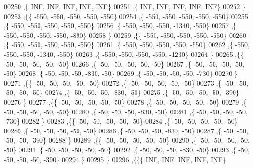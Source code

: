 \begin{DoxyCode}
00250   ,\{   \hyperlink{energy__const_8h_a12c2040f25d8e3a7b9e1c2024c618cb6}{INF},   \hyperlink{energy__const_8h_a12c2040f25d8e3a7b9e1c2024c618cb6}{INF},   \hyperlink{energy__const_8h_a12c2040f25d8e3a7b9e1c2024c618cb6}{INF},   \hyperlink{energy__const_8h_a12c2040f25d8e3a7b9e1c2024c618cb6}{INF},   INF\}
00251   ,\{   \hyperlink{energy__const_8h_a12c2040f25d8e3a7b9e1c2024c618cb6}{INF},   \hyperlink{energy__const_8h_a12c2040f25d8e3a7b9e1c2024c618cb6}{INF},   \hyperlink{energy__const_8h_a12c2040f25d8e3a7b9e1c2024c618cb6}{INF},   \hyperlink{energy__const_8h_a12c2040f25d8e3a7b9e1c2024c618cb6}{INF},   INF\}
00252   \}
00253  ,\{\{  -550,  -550,  -550,  -550,  -550\}
00254   ,\{  -550,  -550,  -550,  -550,  -550\}
00255   ,\{  -550,  -550,  -550,  -550,  -550\}
00256   ,\{  -550,  -550,  -550, -1340,  -550\}
00257   ,\{  -550,  -550,  -550,  -550,  -890\}
00258   \}
00259  ,\{\{  -550,  -550,  -550,  -550,  -550\}
00260   ,\{  -550,  -550,  -550,  -550,  -550\}
00261   ,\{  -550,  -550,  -550,  -550,  -550\}
00262   ,\{  -550,  -550,  -550, -1340,  -550\}
00263   ,\{  -550,  -550,  -550,  -550, -1230\}
00264   \}
00265  ,\{\{   -50,   -50,   -50,   -50,   -50\}
00266   ,\{   -50,   -50,   -50,   -50,   -50\}
00267   ,\{   -50,   -50,   -50,   -50,   -50\}
00268   ,\{   -50,   -50,   -50,  -830,   -50\}
00269   ,\{   -50,   -50,   -50,   -50,  -730\}
00270   \}
00271  ,\{\{   -50,   -50,   -50,   -50,   -50\}
00272   ,\{   -50,   -50,   -50,   -50,   -50\}
00273   ,\{   -50,   -50,   -50,   -50,   -50\}
00274   ,\{   -50,   -50,   -50,  -830,   -50\}
00275   ,\{   -50,   -50,   -50,   -50,  -390\}
00276   \}
00277  ,\{\{   -50,   -50,   -50,   -50,   -50\}
00278   ,\{   -50,   -50,   -50,   -50,   -50\}
00279   ,\{   -50,   -50,   -50,   -50,   -50\}
00280   ,\{   -50,   -50,   -50,  -830,   -50\}
00281   ,\{   -50,   -50,   -50,   -50,  -730\}
00282   \}
00283  ,\{\{   -50,   -50,   -50,   -50,   -50\}
00284   ,\{   -50,   -50,   -50,   -50,   -50\}
00285   ,\{   -50,   -50,   -50,   -50,   -50\}
00286   ,\{   -50,   -50,   -50,  -830,   -50\}
00287   ,\{   -50,   -50,   -50,   -50,  -390\}
00288   \}
00289  ,\{\{   -50,   -50,   -50,   -50,   -50\}
00290   ,\{   -50,   -50,   -50,   -50,   -50\}
00291   ,\{   -50,   -50,   -50,   -50,   -50\}
00292   ,\{   -50,   -50,   -50,  -830,   -50\}
00293   ,\{   -50,   -50,   -50,   -50,  -390\}
00294   \}
00295  \}
00296 ,\{\{\{   \hyperlink{energy__const_8h_a12c2040f25d8e3a7b9e1c2024c618cb6}{INF},   \hyperlink{energy__const_8h_a12c2040f25d8e3a7b9e1c2024c618cb6}{INF},   \hyperlink{energy__const_8h_a12c2040f25d8e3a7b9e1c2024c618cb6}{INF},   \hyperlink{energy__const_8h_a12c2040f25d8e3a7b9e1c2024c618cb6}{INF},   INF\}

\end{DoxyCode}
